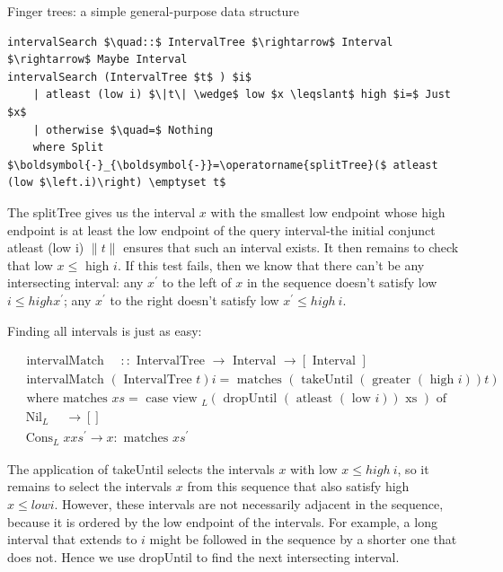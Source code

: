 \documentclass[10pt]{article}
\begin{document}
Finger trees: a simple general-purpose data structure

\begin{verbatim}
intervalSearch $\quad::$ IntervalTree $\rightarrow$ Interval $\rightarrow$ Maybe Interval
intervalSearch (IntervalTree $t$ ) $i$
    | atleast (low i) $\|t\| \wedge$ low $x \leqslant$ high $i=$ Just $x$
    | otherwise $\quad=$ Nothing
    where Split $\boldsymbol{-}_{\boldsymbol{-}}=\operatorname{splitTree}($ atleast (low $\left.i)\right) \emptyset t$
\end{verbatim}

The splitTree gives us the interval $x$ with the smallest low endpoint whose high endpoint is at least the low endpoint of the query interval-the initial conjunct atleast (low i) $\|t\|$ ensures that such an interval exists. It then remains to check that low $x \leqslant$ high $i$. If this test fails, then we know that there can't be any intersecting interval: any $x^{\prime}$ to the left of $x$ in the sequence doesn't satisfy low $i \leqslant h i g h x^{\prime}$; any $x^{\prime}$ to the right doesn't satisfy low $x^{\prime} \leqslant h i g h ~ i$.

Finding all intervals is just as easy:

$$
\begin{aligned}
& \text { intervalMatch } \quad:: \text { IntervalTree } \rightarrow \text { Interval } \rightarrow[\text { Interval }] \\
& \text { intervalMatch }(\text { IntervalTree } t) i=\text { matches }(\text { takeUntil }(\text { greater }(\text { high } i)) t) \\
& \text { where matches } x s=\text { case view }{ }_{L}(\text { dropUntil }(\text { atleast }(\text { low } i)) \text { xs }) \text { of } \\
& \operatorname{Nil}_{L} \quad \rightarrow[] \\
& \operatorname{Cons}_{L} x x s^{\prime} \rightarrow x: \text { matches } x s^{\prime}
\end{aligned}
$$

The application of takeUntil selects the intervals $x$ with low $x \leqslant h i g h ~ i$, so it remains to select the intervals $x$ from this sequence that also satisfy high $x \leqslant l o w i$. However, these intervals are not necessarily adjacent in the sequence, because it is ordered by the low endpoint of the intervals. For example, a long interval that extends to $i$ might be followed in the sequence by a shorter one that does not. Hence we use dropUntil to find the next intersecting interval.
\end{document}
